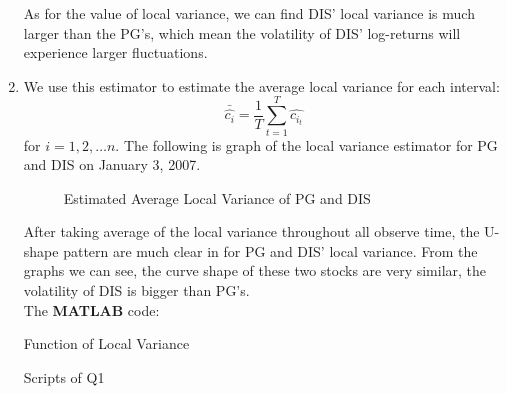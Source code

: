 \documentclass[12pt,letterpaper]{article}
\begin{document}
\begin{enumerate}[label=\textbf{(\Alph*)}]
As for the value of local variance, we can find DIS' local variance is much larger than the PG's, which mean the volatility of DIS' log-returns will experience larger fluctuations. 

\item We use this estimator to estimate the average local variance for each interval:
$$\bar{\hat{c_i}}=\frac{1}{T}\sum_{t=1}^{T}\hat{c_{i_t}}$$
for $i=1,2,\dots n.$
The following is graph of the local variance estimator for PG and DIS on January 3, 2007. 
 \begin{figure}[H]
	\centering
	\caption{Estimated Average Local Variance of PG and DIS}
\end{figure}

After taking average of the local variance throughout all observe time, the U-shape pattern are much clear in for PG and DIS' local variance. From the graphs we can see, the curve shape of these two stocks are very similar, the volatility of DIS is bigger than PG's.\\


The \textbf{MATLAB} code:

Function of Local Variance
   
Scripts of Q1


\end{enumerate}
 

\newpage

\end{document}
